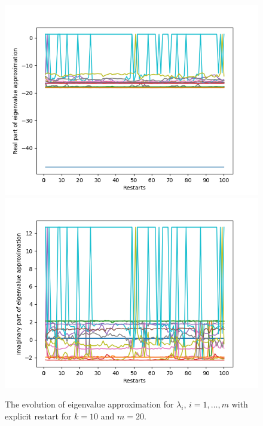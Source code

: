 \begin{figure}[h!]
\centering
\includegraphics[scale=0.4]{../task7/task7a1_k10m20.png}
\includegraphics[scale=0.4]{../task7/task7a2_k10m20.png}
\caption{The evolution of eigenvalue approximation for $\lambda_{i}$, $i = 1,\ldots,m$ with explicit restart for $k = 10$ and $m=20$.}
\label{fig:task7a1k10}
\end{figure}


